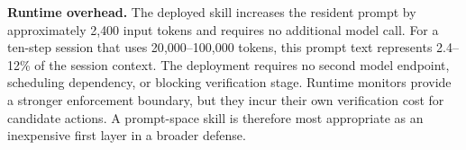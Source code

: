 \textbf{Runtime overhead.}
The deployed skill increases the resident prompt by approximately 2{,}400 input tokens and requires no additional model call. For a ten-step session that uses 20{,}000--100{,}000 tokens, this prompt text represents 2.4--12\% of the session context. The deployment requires no second model endpoint, scheduling dependency, or blocking verification stage. Runtime monitors provide a stronger enforcement boundary, but they incur their own verification cost for candidate actions. A prompt-space skill is therefore most appropriate as an inexpensive first layer in a broader defense.

